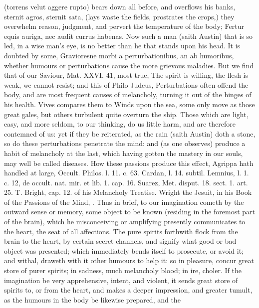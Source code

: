 {(torrens velut aggere rupto) bears down all before, and overflows his
banks, sternit agros, sternit sata, (lays waste the fields, prostrates
the crops,) they overwhelm reason, judgment, and pervert the
temperature of the body; Fertur  equis auriga, nec audit currus
habenas. Now such a man (saith Austin) that is so led, in a wise
man's eye, is no better than he that stands upon his head. It is
doubted by some, Gravioresne morbi a perturbationibus, an ab humoribus,
whether humours or perturbations cause the more grievous maladies. But
we find that of our Saviour, Mat. XXVI. 41, most true, The spirit is
willing, the flesh is weak, we cannot resist; and this of Philo
Judeus, Perturbations often offend the body, and are most frequent
causes of melancholy, turning it out of the hinges of his health. Vives
compares them to Winds upon the sea, some only move as those
great gales, but others turbulent quite overturn the ship. Those which
are light, easy, and more seldom, to our thinking, do us little harm,
and are therefore contemned of us: yet if they be reiterated, as
the rain (saith Austin) doth a stone, so do these perturbations
penetrate the mind: and (as one observes) produce a habit of
melancholy at the last, which having gotten the mastery in our souls,
may well be called diseases.
How these passions produce this effect, Agrippa hath handled at
large, Occult. Philos. l. 11. c. 63. Cardan, l. 14. subtil. Lemnius, l.
1. c. 12, de occult. nat. mir. et lib. 1. cap. 16. Suarez, Met. disput.
18. sect. 1. art. 25. T. Bright, cap. 12. of his Melancholy Treatise.
Wright the Jesuit, in his Book of the Passions of the Mind, \etc{}. Thus in
brief, to our imagination cometh by the outward sense or memory, some
object to be known (residing in the foremost part of the brain), which
he misconceiving or amplifying presently communicates to the heart, the
seat of all affections. The pure spirits forthwith flock from the brain
to the heart, by certain secret channels, and signify what good or bad
object was presented; which immediately bends itself to
prosecute, or avoid it; and withal, draweth with it other humours to
help it: so in pleasure, concur great store of purer spirits; in
sadness, much melancholy blood; in ire, choler. If the imagination be
very apprehensive, intent, and violent, it sends great store of spirits
to, or from the heart, and makes a deeper impression, and greater
tumult, as the humours in the body be likewise prepared, and the
}
